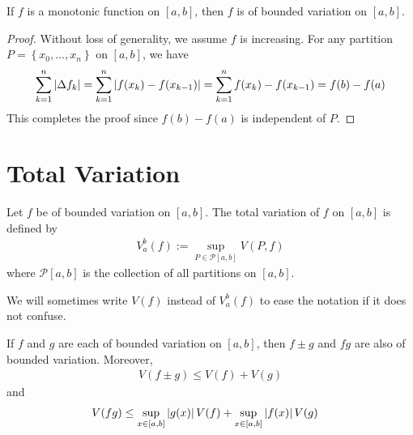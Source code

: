 \documentclass[thmcnt=section, 12pt]{my-elegantbook}
\begin{document}

\begin{theorem} \label{thm:36}
    If $f$ is a monotonic function on $[a, b]$, then $f$ is of bounded variation on $[a, b]$.
\end{theorem}

\begin{proof}
    Without loss of generality, we assume $f$ is increasing. For any partition $P = \left\{x_0, \ldots, x_n\right\}$ on $[a, b]$, we have 
    \begin{align*}
        \sum_{k=1}^n \left\lvert \Delta f_k \right\rvert
        = \sum_{k=1}^n \left\lvert f(x_k) - f(x_{k-1}) \right\rvert
        = \sum_{k=1}^n f(x_k) - f(x_{k-1})
        = f(b) - f(a)
    \end{align*}
    This completes the proof since $f(b) - f(a)$ is independent of $P$.
\end{proof}


\section{Total Variation}


\begin{definition}
    Let $f$ be of bounded variation on $[a, b]$. The total variation of $f$ on $[a, b]$ is defined by 
    \begin{align*}
        V_a^b (f) 
        := \sup_{P \in \mathcal{P}[a, b]} V(P, f) 
    \end{align*}
    where $\mathcal{P}[a, b]$ is the collection of all partitions on $[a, b]$.
\end{definition}

\begin{note}
    We will sometimes write $V(f)$ instead of $V_a^b (f)$ to ease the notation if it does not confuse.
\end{note}


\begin{theorem} \label{thm:33}
    If $f$ and $g$ are each of bounded variation on $[a, b]$, then $f \pm g$ and $f g$ are also of bounded variation. Moreover, 
    \begin{align}
        V(f \pm g) \leq V(f) + V(g) 
        \label{eq:77}
    \end{align}
    and 
    \begin{align}
        V(f g) &\leq \sup_{x\in [a, b]} \left\lvert g(x) \right\rvert V(f) + \sup_{x \in [a, b]} \left\lvert f(x) \right\rvert V(g)
        \label{eq:78}
    \end{align}
\end{theorem}
\end{document}

